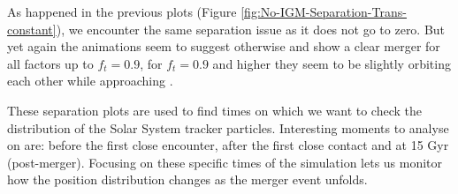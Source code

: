 \documentclass[a4paper,12pt, english]{article}
\begin{document}
\smallskip
As happened in the previous plots (Figure \ref{fig:No-IGM-Separation-Trans-constant}), we encounter the same separation issue as it does not go to zero. But yet again the animations seem to suggest otherwise and show a clear merger for all factors up to $f_t=0.9$, for $f_t=0.9$ and higher they seem to be slightly orbiting each other while approaching .\par
\smallskip
These separation plots are used to find times on which we want to check the distribution of the Solar System tracker particles. Interesting moments to analyse on are: before the first close encounter, after the first close contact and at 15 Gyr (post-merger). Focusing on these specific times of the simulation lets us monitor how the position distribution changes as the merger event unfolds.\par
\newpage
\end{document}
